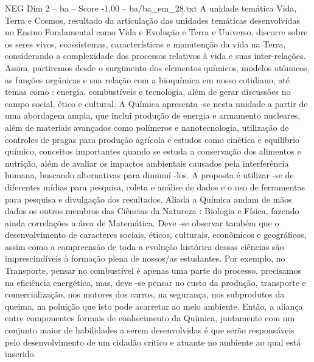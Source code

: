 \begin{textsample}{NEG Dim 2 – ba – Score -1.00 – ba/ba\_em\_28.txt}
A unidade temática Vida, Terra e Cosmos, resultado da articulação das unidades temáticas desenvolvidas no Ensino Fundamental como Vida e Evolução e Terra e Universo, discorre sobre os seres vivos, ecossistemas, características e manutenção da vida na Terra, considerando a complexidade dos processos relativos à vida e suas inter-relações.
Assim, partiremos desde o surgimento dos elementos químicos, modelos atômicos, as funções orgânicas e sua relação com a bioquímica em nosso cotidiano, até temas como : energia, combustíveis e tecnologia, além de gerar discussões no campo social, ético e cultural.
A Química apresenta -se nesta unidade a partir de uma abordagem ampla, que inclui produção de energia e armamento nucleares, além de materiais avançados como polímeros e nanotecnologia, utilização de controles de pragas para produção agrícola e estudos como cinética e equilíbrio químico, conceitos importantes quando se estuda a conservação dos alimentos e nutrição, além de avaliar os impactos ambientais causados pela interferência humana, buscando alternativas para diminuí -los.
A proposta é utilizar -se de diferentes mídias para pesquisa, coleta e análise de dados e o uso de ferramentas para pesquisa e divulgação dos resultados.
Aliada a Química andam de mãos dados os outros membros das Ciências da Natureza : Biologia e Física, fazendo ainda correlações a área de Matemática.
Deve -se observar também que o desenvolvimento de caracteres sociais, éticos, culturais, econômicos e geográficos, assim como a compreensão de toda a evolução histórica dessas ciências são imprescindíveis à formação plena de nossos/as estudantes.
Por exemplo, no Transporte, pensar no combustível é apenas uma parte do processo, precisamos na eficiência energética, mas, deve -se pensar no custo da produção, transporte e comercialização, nos motores dos carros, na segurança, nos subprodutos da queima, na poluição que isto pode acarretar ao meio ambiente.
Então, a aliança entre componentes formais de conhecimento da Química, juntamente com um conjunto maior de habilidades a serem desenvolvidas é que serão responsáveis pelo desenvolvimento de um cidadão crítico e atuante no ambiente ao qual está inserido.

\end{textsample}
